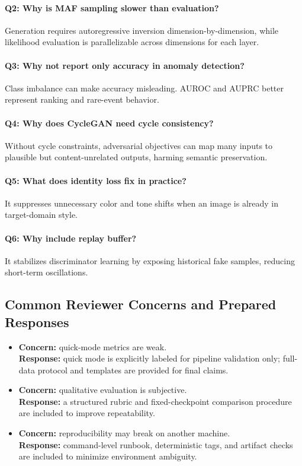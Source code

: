 \documentclass[conference]{IEEEtran}
\begin{document}
\paragraph{Q2: Why is MAF sampling slower than evaluation?}
Generation requires autoregressive inversion dimension-by-dimension, while likelihood evaluation is parallelizable across dimensions for each layer.

\paragraph{Q3: Why not report only accuracy in anomaly detection?}
Class imbalance can make accuracy misleading. AUROC and AUPRC better represent ranking and rare-event behavior.

\paragraph{Q4: Why does CycleGAN need cycle consistency?}
Without cycle constraints, adversarial objectives can map many inputs to plausible but content-unrelated outputs, harming semantic preservation.

\paragraph{Q5: What does identity loss fix in practice?}
It suppresses unnecessary color and tone shifts when an image is already in target-domain style.

\paragraph{Q6: Why include replay buffer?}
It stabilizes discriminator learning by exposing historical fake samples, reducing short-term oscillations.

\subsection{Common Reviewer Concerns and Prepared Responses}
\begin{itemize}
\item \textbf{Concern:} quick-mode metrics are weak. \\
\textbf{Response:} quick mode is explicitly labeled for pipeline validation only; full-data protocol and templates are provided for final claims.
\item \textbf{Concern:} qualitative evaluation is subjective. \\
\textbf{Response:} a structured rubric and fixed-checkpoint comparison procedure are included to improve repeatability.
\item \textbf{Concern:} reproducibility may break on another machine. \\
\textbf{Response:} command-level runbook, deterministic tags, and artifact checks are included to minimize environment ambiguity.
\end{itemize}
\end{document}
